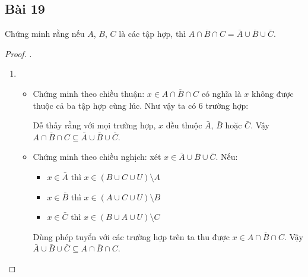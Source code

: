 \subsection*{Bài 19}
Chứng minh rằng nếu $A$, $B$, $C$ là các tập hợp, thì $\overline{A\cap B\cap C}=\bar A\cup\bar B\cup\bar C$.
\begin{proof}.
    \begin{enumerate}[label=\alph*)]
        \item \begin{itemize}
            \item Chứng minh theo chiều thuận: $x\in\overline{A\cap B\cap C}$ có nghĩa là $x$ không được thuộc cả ba tập hợp cùng lúc. Như vậy ta có 6 trường hợp: \begin{itemize}
            \end{itemize}
            Dễ thấy rằng với mọi trường hợp, $x$ đều thuộc $\bar A$, $\bar B$ hoặc $\bar C$. Vậy $\overline{A\cap B\cap C}\subseteq\bar A\cup\bar B\cup\bar C$.
            \item Chứng minh theo chiều nghịch: xét $x\in\bar A\cup\bar B\cup\bar C$. Nếu:
            \begin{itemize}
                \item $x\in\bar A$ thì $x\in (B\cup C\cup U)\setminus A$
                \item $x\in\bar B$ thì $x\in (A\cup C\cup U)\setminus B$
                \item $x\in\bar C$ thì $x\in (B\cup A\cup U)\setminus C$
            \end{itemize}
            Dùng phép tuyển với các trường hợp trên ta thu được $x\in\overline{A\cap B\cap C}$. Vậy $\bar A\cup\bar B\cup\bar C\subseteq\overline{A\cap B\cap C}$.
        \end{itemize}

\end{enumerate}
\end{proof}
